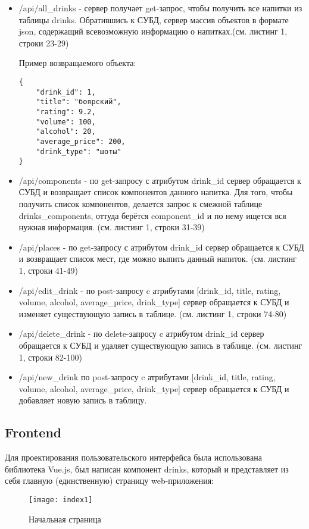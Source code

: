 \begin{itemize}
	\item /api/all\_drinks - сервер получает get-запрос, чтобы получить все напитки из таблицы drinks. Обратившись к СУБД, сервер массив объектов в формате json, содержащий всевозможную информацию о напитках.(см. листинг 1, строки 23-29)
	
	Пример возвращаемого объекта:
\begin{lstlisting}
{
	"drink_id": 1,
	"title": "боярский",
	"rating": 9.2,
	"volume": 100,
	"alcohol": 20,
	"average_price": 200,
	"drink_type": "шоты"
}\end{lstlisting}
	\item /api/components - по get-запросу с атрибутом drink\_id сервер обращается к СУБД и возвращает список компонентов данного напитка. Для того, чтобы получить список компонентов, делается запрос к смежной таблице drinks\_components, оттуда берётся component\_id и по нему ищется вся нужная информация. (см. листинг 1, строки 31-39)
	\item /api/places - по get-запросу с атрибутом drink\_id сервер обращается к СУБД и возвращает список мест, где можно выпить данный напиток. (см. листинг 1, строки 41-49)
	\item /api/edit\_drink - по post-запросу c атрибутами [drink\_id, title, rating, volume, alcohol, average\_price, drink\_type] сервер обращается к СУБД и изменяет существующую запись в таблице. (см. листинг 1, строки 74-80)
	\item /api/delete\_drink - по delete-запросу c атрибутом drink\_id сервер обращается к СУБД и удаляет существующую запись в таблице. (см. листинг 1, строки 82-100)
	\item /api/new\_drink по post-запросу c атрибутами [drink\_id, title, rating, volume, alcohol, average\_price, drink\_type] сервер обращается к СУБД и добавляет новую запись в таблицу.
\end{itemize}



\subsection{Frontend}
Для проектирования пользовательского интерфейса была использована библиотека Vue.js, был написан компонент drinks, который и представляет из себя главную (единственную) страницу web-приложения:

\begin{figure}[H]
	\begin{center}
		\texttt{[image: index1]}
		\caption{Начальная страница} 
		\label{pic:1} %
	\end{center}
\end{figure}

